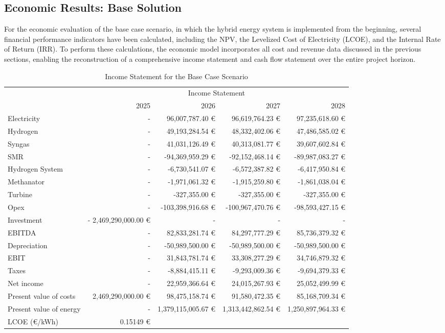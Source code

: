 \subsection{Economic Results: Base Solution}
For the economic evaluation of the base case scenario, in which the hybrid energy system is implemented from the beginning, several financial performance indicators have been calculated, including the NPV, the Levelized Cost of Electricity (LCOE), and the Internal Rate of Return (IRR). To perform these calculations, the economic model incorporates all cost and revenue data discussed in the previous sections, enabling the reconstruction of a comprehensive income statement and cash flow statement over the entire project horizon.

\begin{table}[!htbp]
\centering
\scriptsize
\begin{tabular}{lrrrr}
\toprule
 & \multicolumn{4}{c}{Income Statement} \\
\cmidrule(l){2-5}
 & 2025 & 2026 & 2027 & 2028 \\
Electricity & - & 96,007,787.40 € & 96,619,764.23 € & 97,235,618.60 € \\
Hydrogen & - & 49,193,284.54 € & 48,332,402.06 € & 47,486,585.02 € \\
Syngas & - & 41,031,126.49 € & 40,313,081.77 € & 39,607,602.84 € \\
SMR & - & -94,369,959.29 € & -92,152,468.14 € & -89,987,083.27 € \\
Hydrogen System & - & -6,730,541.07 € & -6,572,387.82 € & -6,417,950.84 € \\
Methanator & - & -1,971,061.32 € & -1,915,259.80 € & -1,861,038.04 € \\
Turbine & - & -327,355.00 € & -327,355.00 € & -327,355.00 € \\
Opex & - & -103,398,916.68 € & -100,967,470.76 € & -98,593,427.15 € \\
Investment & - 2,469,290,000.00 € & - & - & - \\
EBITDA & - & 82,833,281.74 € & 84,297,777.29 € & 85,736,379.32 € \\
Depreciation & - & -50,989,500.00 € & -50,989,500.00 € & -50,989,500.00 € \\
EBIT & - & 31,843,781.74 € & 33,308,277.29 € & 34,746,879.32 € \\
Taxes & - & -8,884,415.11 € & -9,293,009.36 € & -9,694,379.33 € \\
Net income & - & 22,959,366.64 € & 24,015,267.93 € & 25,052,499.99 € \\
Present value of costs & 2,469,290,000.00 € & 98,475,158.74 € & 91,580,472.35 € & 85,168,709.34 € \\
Present value of energy & - & 1,379,115,005.67 € & 1,313,442,862.54 € & 1,250,897,964.33 € \\
LCOE (€/kWh) & 0.15149 € & & & \\
\bottomrule
\end{tabular}
\caption{Income Statement for the Base Case Scenario}
\end{table}

